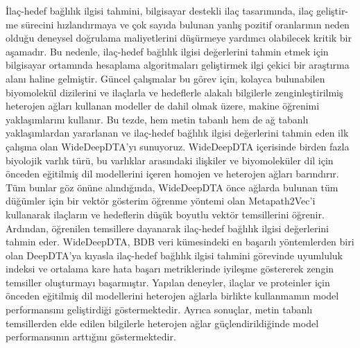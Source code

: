 \begin{ozet}
İlaç-hedef bağlılık ilgisi tahmini, bilgisayar destekli ilaç tasarımında, ilaç geliştir-
\\me sürecini hızlandırmaya ve çok sayıda bulunan yanlış pozitif oranlarının neden olduğu deneysel doğrulama maliyetlerini düşürmeye yardımcı olabilecek kritik bir aşamadır. Bu nedenle, ilaç-hedef bağlılık ilgisi değerlerini tahmin etmek için bilgisayar ortamında hesaplama algoritmaları geliştirmek ilgi çekici bir araştırma alanı haline gelmiştir. Güncel çalışmalar bu görev için, kolayca bulunabilen biyomolekül dizilerini ve ilaçlarla ve hedeflerle alakalı bilgilerle zenginleştirilmiş heterojen ağları kullanan modeller de dahil olmak üzere, makine öğrenimi yaklaşımlarını kullanır. Bu tezde, hem metin tabanlı hem de ağ tabanlı yaklaşımlardan yararlanan ve ilaç-hedef bağlılık ilgisi değerlerini tahmin eden ilk çalışma olan WideDeepDTA'yı sunuyoruz. WideDeepDTA içerisinde birden fazla biyolojik varlık türü, bu varlıklar arasındaki ilişkiler ve biyomoleküler dil için önceden eğitilmiş dil modellerini içeren homojen ve heterojen ağları barındırır. Tüm bunlar göz önüne alındığında, WideDeepDTA önce ağlarda bulunan tüm düğümler için bir vektör gösterim öğrenme yöntemi olan Metapath2Vec'i kullanarak ilaçların ve hedeflerin düşük boyutlu vektör temsillerini öğrenir. Ardından, öğrenilen temsillere dayanarak ilaç-hedef bağlılık ilgisi değerlerini tahmin eder. WideDeepDTA, BDB veri kümesindeki en başarılı yöntemlerden biri olan DeepDTA'ya kıyasla ilaç-hedef bağlılık ilgisi tahmini görevinde uyumluluk indeksi ve ortalama kare hata başarı metriklerinde iyileşme göstererek zengin temsiller oluşturmayı başarmıştır. Yapılan deneyler, ilaçlar ve proteinler için önceden eğitilmiş dil modellerini heterojen ağlarla birlikte kullanmamın model performansını geliştirdiği göstermektedir. Ayrıca sonuçlar, metin tabanlı temsillerden elde edilen bilgilerle heterojen ağlar güçlendirildiğinde model performansının arttığını göstermektedir.
\end{ozet}